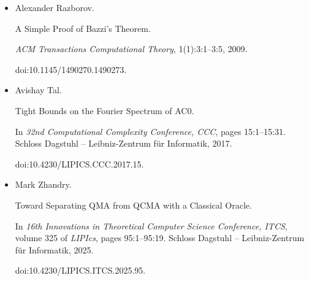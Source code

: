 \begin{itemize}
In \emph{51st ACM Symposium on Theory of Computing, STOC}, pages
13–23. ACM, 2019.


doi:10.1145/3313276.3316315.





\item[] 
[21]

Alexander Razborov.


A Simple Proof of Bazzi’s Theorem.


\emph{ACM Transactions Computational Theory}, 1(1):3:1–3:5, 2009.


doi:10.1145/1490270.1490273.





\item[] 
[22]

Avishay Tal.


Tight Bounds on the Fourier Spectrum of AC0.


In \emph{32nd Computational Complexity Conference, CCC}, pages
15:1–15:31. Schloss Dagstuhl – Leibniz-Zentrum für Informatik, 2017.


doi:10.4230/LIPICS.CCC.2017.15.





\item[] 
[23]

Mark Zhandry.


Toward Separating QMA from QCMA with a Classical Oracle.


In \emph{16th Innovations in Theoretical Computer Science Conference,
ITCS}, volume 325 of \emph{LIPIcs}, pages 95:1–95:19. Schloss Dagstuhl –
Leibniz-Zentrum für Informatik, 2025.


doi:10.4230/LIPICS.ITCS.2025.95.





\end{itemize}

